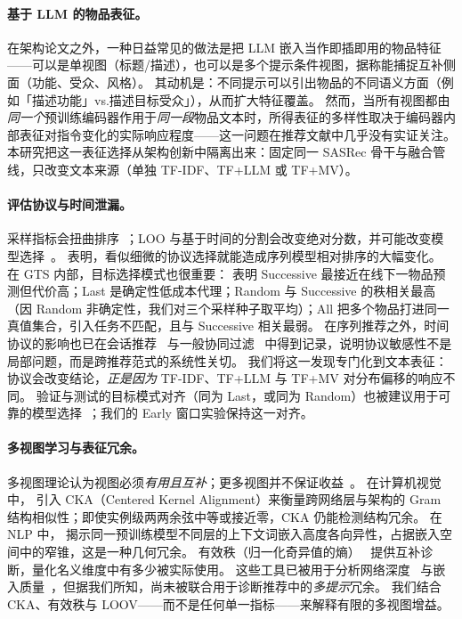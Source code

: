 \documentclass[sigconf,natbib=true,anonymous]{acmart}
\newcommand{\tfidf}{\textsc{TF-IDF}\xspace}
\newcommand{\tfllm}{\textsc{TF+LLM}\xspace}
\newcommand{\tfmv}{\textsc{TF+MV}\xspace}
\begin{document}
\paragraph{基于 LLM 的物品表征。}
在架构论文之外，一种日益常见的做法是把 LLM 嵌入当作即插即用的物品特征——可以是单视图（标题/描述），也可以是多个提示条件视图，据称能捕捉互补侧面（功能、受众、风格）。
其动机是：不同提示可以引出物品的不同语义方面（例如「描述功能」vs.\「描述目标受众」），从而扩大特征覆盖。
然而，当所有视图都由\emph{同一个}预训练编码器作用于\emph{同一段}物品文本时，所得表征的多样性取决于编码器内部表征对指令变化的实际响应程度——这一问题在推荐文献中几乎没有实证关注。
本研究把这一表征选择从架构创新中隔离出来：固定同一 SASRec 骨干与融合管线，只改变文本来源（单独 \tfidf、\tfllm 或 \tfmv）。

\paragraph{评估协议与时间泄漏。}
采样指标会扭曲排序~\cite{krichene2020sampledmetrics}；LOO 与基于时间的分割会改变绝对分数，并可能改变模型选择~\cite{ji2023evaluation,sun2023reevaluation,meng2020temporal}。
\citet{hidasi2018recurrent} 表明，看似细微的协议选择就能造成序列模型相对排序的大幅变化。
在 GTS 内部，目标选择模式也很重要：\citet{gusak2025time} 表明 Successive 最接近在线下一物品预测但代价高；Last 是确定性低成本代理；Random 与 Successive 的秩相关最高（因 Random 非确定性，我们对三个采样种子取平均）；All 把多个物品打进同一真值集合，引入任务不匹配，且与 Successive 相关最弱。
在序列推荐之外，时间协议的影响也已在会话推荐~\cite{hidasi2018recurrent} 与一般协同过滤~\cite{meng2020temporal} 中得到记录，说明协议敏感性不是局部问题，而是跨推荐范式的系统性关切。
我们将这一发现专门化到文本表征：协议会改变结论，\emph{正是因为} \tfidf、\tfllm 与 \tfmv 对分布偏移的响应不同。
验证与测试的目标模式对齐（同为 Last，或同为 Random）也被建议用于可靠的模型选择~\cite{gusak2025time}；我们的 Early 窗口实验保持这一对齐。

\paragraph{多视图学习与表征冗余。}
多视图理论认为视图必须\emph{有用且互补}；更多视图并不保证收益~\cite{xu2013multiview}。
在计算机视觉中，\citet{kornblith2019cka} 引入 CKA（Centered Kernel Alignment）来衡量跨网络层与架构的 Gram 结构相似性；即使实例级两两余弦中等或接近零，CKA 仍能检测结构冗余。
在 NLP 中，\citet{ethayarajh2019contextual} 揭示同一预训练模型不同层的上下文词嵌入高度各向异性，占据嵌入空间中的窄锥，这是一种几何冗余。
有效秩（归一化奇异值的熵）~\cite{roy2007effective} 提供互补诊断，量化名义维度中有多少被实际使用。
这些工具已被用于分析网络深度~\cite{kornblith2019cka} 与嵌入质量~\cite{ethayarajh2019contextual}，但据我们所知，尚未被联合用于诊断推荐中的\emph{多提示}冗余。
我们结合 CKA、有效秩与 LOOV——而不是任何单一指标——来解释有限的多视图增益。
\end{document}
